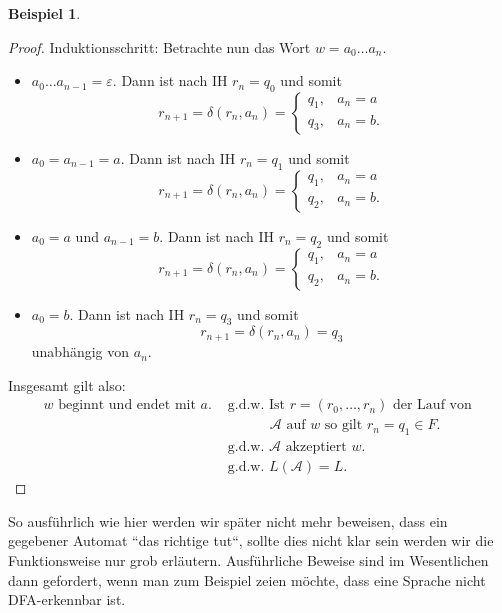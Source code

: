 \documentclass[11pt, a4paper]{article}
\theoremstyle{definition}
\newtheorem{example}[definition]{Beispiel}
\theoremstyle{plain}
\numberwithin{equation}{section}
\begin{document}
\begin{example}
\begin{proof}
		Induktionsschritt: Betrachte nun das Wort \( w = a_0 \ldots a_n \).
		\begin{itemize}
			\item \( a_0 \ldots a_{n-1} = \varepsilon \). Dann ist nach IH \( r_n = q_0 \) und somit
				\[
					r_{n+1} = \delta(r_n, a_n) = \left\lbrace
							\begin{array}{ll}
								q_1, & a_n = a\\
								q_3, & a_n = b.
							\end{array}
						\right.
				\]
			\item \( a_0 = a_{n-1} = a \). Dann ist nach IH \( r_n = q_1 \) und somit
				\[
					r_{n+1} = \delta(r_n, a_n) = \left\lbrace
							\begin{array}{ll}
								q_1, & a_n = a\\
								q_2, & a_n = b.
							\end{array}
						\right.
				\]
			\item \( a_0 = a \) und \( a_{n-1} = b \). Dann ist nach IH \( r_n = q_2 \) und somit
				\[
					r_{n+1} = \delta(r_n, a_n) = \left\lbrace
							\begin{array}{ll}
								q_1, & a_n = a\\
								q_2, & a_n = b.
							\end{array}
						\right.
				\]
			\item \( a_0 = b \). Dann ist nach IH \( r_n = q_3 \) und somit
				\[
					r_{n+1} = \delta(r_n, a_n) = q_3
				\]
				unabhängig von \( a_n \).
		\end{itemize}
		Insgesamt gilt also: 
		\begin{align*}
			w \text{ beginnt und endet mit } a. &\text{ g.d.w. } \text{Ist } r = (r_0, \ldots, r_n) \text{ der Lauf von }\\ &\quad\quad\quad\,\, \mathcal{A} \text{ auf } w \text{ so gilt } r_n = q_1 \in F.\\
			&\text{ g.d.w. } \mathcal{A} \text{ akzeptiert } w.\\
			&\text{ g.d.w. } L(\mathcal{A}) = L.
		\end{align*}
	\end{proof}
\end{example}
So ausführlich wie hier werden wir später nicht mehr beweisen, dass ein gegebener Automat ``das richtige tut``, sollte dies nicht klar sein werden wir die Funktionsweise nur grob erläutern. Ausführliche Beweise sind im Wesentlichen dann gefordert, wenn man zum Beispiel zeien möchte, dass eine Sprache nicht DFA-erkennbar ist.
\end{document}

